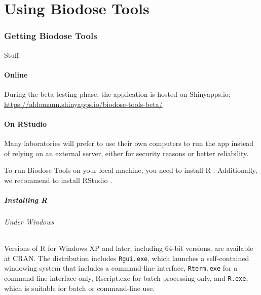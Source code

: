 \documentclass[]{scrartcl}
\let\oldparagraph\paragraph
\renewcommand{\paragraph}[1]{\oldparagraph{#1}\mbox{}}
\begin{document}
\hypertarget{part-using-biodose-tools}{%
\part{Using Biodose Tools}\label{part-using-biodose-tools}}

\hypertarget{get}{%
\section{Getting Biodose Tools}\label{get}}

Stuff

\hypertarget{get-online}{%
\subsection{Online}\label{get-online}}

During the beta testing phase, the application is hosted on Shinyapps.io: \url{https://aldomann.shinyapps.io/biodose-tools-beta/}

\hypertarget{get-offline}{%
\subsection{On RStudio}\label{get-offline}}

Many laboratories will prefer to use their own computers to run the app instead of relying on an external server, either for security reasons or better reliability.

To run Biodose Tools on your local machine, you need to install R \citep{R-base}. Additionally, we recommend to install RStudio \citep{R-Rstudio}.

\hypertarget{installing-r}{%
\subsubsection{Installing R}\label{installing-r}}

\hypertarget{under-windows}{%
\paragraph{Under Windows}\label{under-windows}}

Versions of R for Windows XP and later, including 64-bit versions, are available at CRAN. The distribution includes \texttt{Rgui.exe}, which launches a self-contained windowing system that includes a command-line interface, \texttt{Rterm.exe} for a command-line interface only, Rscript.exe for batch processing only, and \texttt{R.exe}, which is suitable for batch or command-line use.
\end{document}
